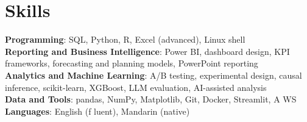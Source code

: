 \documentclass[letterpaper,11pt]{article}
\begin{document}
\section{\textbf{Skills}}
 \begin{itemize}[leftmargin=0.15in, label={}]
    \small{\item{
     \textbf{Programming}{: SQL, Python, R, Excel (advanced), Linux shell} \\
     \textbf{Reporting and Business Intelligence}{: Power BI, dashboard design, KPI frameworks, forecasting and planning models, PowerPoint reporting} \\
     \textbf{Analytics and Machine Learning}{: A/B testing, experimental design, causal inference, scikit-learn, XGBoost, LLM evaluation, AI-assisted analysis} \\
     \textbf{Data and Tools}{: pandas, NumPy, Matplotlib, Git, Docker, Streamlit, A\kern0pt WS} \\
     \textbf{Languages}{: English (f\kern0pt luent), Mandarin (native)}}}

 \end{itemize}
\end{document}
